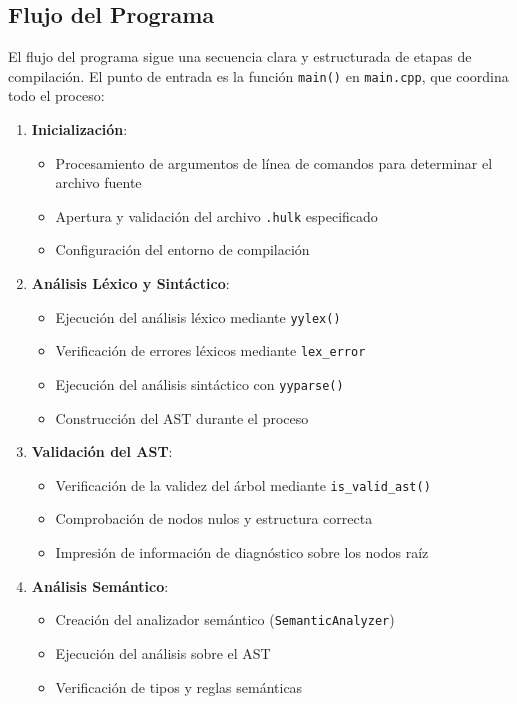 \documentclass[11pt, a4paper, twoside]{article} %
\begin{document}
\subsection{Flujo del Programa}
El flujo del programa sigue una secuencia clara y estructurada de etapas de compilación. El punto de entrada es la función \texttt{main()} en \texttt{main.cpp}, que coordina todo el proceso:

\begin{enumerate}
    \item \textbf{Inicialización}:
    \begin{itemize}
        \item Procesamiento de argumentos de línea de comandos para determinar el archivo fuente
        \item Apertura y validación del archivo \texttt{.hulk} especificado
        \item Configuración del entorno de compilación
    \end{itemize}

    \item \textbf{Análisis Léxico y Sintáctico}:
    \begin{itemize}
        \item Ejecución del análisis léxico mediante \texttt{yylex()}
        \item Verificación de errores léxicos mediante \texttt{lex\_error}
        \item Ejecución del análisis sintáctico con \texttt{yyparse()}
        \item Construcción del AST durante el proceso
    \end{itemize}

    \item \textbf{Validación del AST}:
    \begin{itemize}
        \item Verificación de la validez del árbol mediante \texttt{is\_valid\_ast()}
        \item Comprobación de nodos nulos y estructura correcta
        \item Impresión de información de diagnóstico sobre los nodos raíz
    \end{itemize}

    \item \textbf{Análisis Semántico}:
    \begin{itemize}
        \item Creación del analizador semántico (\texttt{SemanticAnalyzer})
        \item Ejecución del análisis sobre el AST
        \item Verificación de tipos y reglas semánticas
    \end{itemize}


\end{enumerate}
\end{document}
